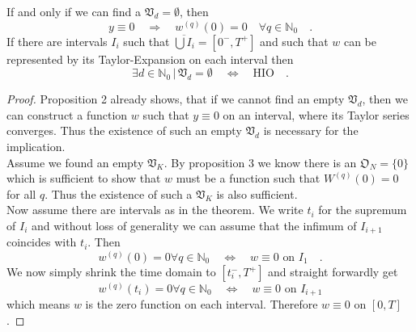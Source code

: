 \begin{theorem}{}{}
	If and only if we can find a $\mathfrak{V}_d = \emptyset$, then
	\begin{equation}
	y\equiv 0 \quad \Rightarrow \quad w^{(q)}(0)=0\quad \forall q\in\mathbb{N}_0 \quad .
	\end{equation}
	If there are intervals $I_i$ such that $\overline{\bigcup I_i}=[0^-,T^+]$ and such that 
	$w$ can be represented by its Taylor-Expansion on each interval then
	\begin{equation}
	\exists d\in\mathbb{N}_0\,|\, \mathfrak{V}_d = \emptyset \quad \Longleftrightarrow \quad \text{HIO} \quad .
\end{equation}		
\end{theorem}
\begin{proof}
	Proposition 2 already shows, that if we cannot find an empty $\mathfrak{V}_d$, then we can construct a 
	function $w$ such that $y\equiv 0$ on an interval, where its Taylor series converges. Thus the existence of 
	such an empty $\mathfrak{V}_d$ is necessary for the implication.\\
	 
	Assume we found an empty $\mathfrak{V}_K$. By proposition 3 we know there is an $\mathfrak{O}_N=\{0\}$ 
	which is sufficient to show that $w$ must be a function such that $W^{(q)}(0)=0$ for all $q$. Thus the 
	existence of such a $\mathfrak{V}_K$ is also sufficient. \\
	
	Now assume there are intervals as in the theorem. 
	We write $t_i$ for the supremum of 
	$I_i$ and without loss of generality we can assume that the infimum of $I_{i+1}$ 
	coincides with $t_i$. 
	Then 
	\begin{equation}
	w^{(q)}(0) = 0 \forall q\in\mathbb{N}_0  \quad \Leftrightarrow \quad w\equiv 0 
	\text{ on }I_1 \quad .
	\end{equation}
	We now simply shrink the time domain to $[t_i^-,T^+]$ and straight forwardly get 
	\begin{equation}
	w^{(q)}(t_i) = 0 \forall q\in\mathbb{N}_0  \quad \Leftrightarrow \quad w\equiv 0
	\text{ on } I_{i+1}
	\end{equation}
	which means $w$ is the zero function on each interval. 
	Therefore $w\equiv 0$ on $[0,T]$.
\end{proof}
%
%
